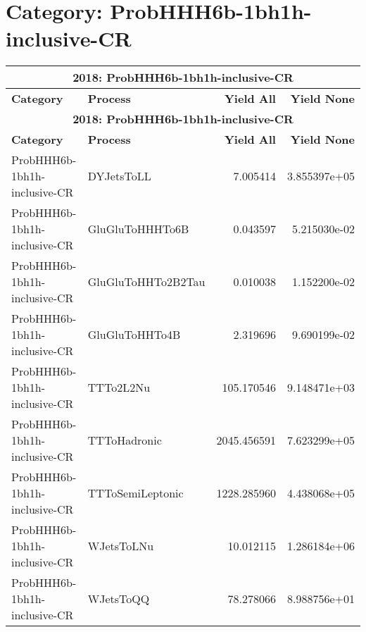 \documentclass{article}
\begin{document}
\section*{Category: ProbHHH6b-1bh1h-inclusive-CR}
\begin{longtable}[c]{|l|l|r|r|}
\hline
\multicolumn{4}{|c|}{\textbf{2018: ProbHHH6b-1bh1h-inclusive-CR}} \\
\hline
\textbf{Category} & \textbf{Process} & \textbf{Yield All} & \textbf{Yield None} \\
\hline
\endfirsthead
\hline
\multicolumn{4}{|c|}{\textbf{2018: ProbHHH6b-1bh1h-inclusive-CR}} \\
\hline
\textbf{Category} & \textbf{Process} & \textbf{Yield All} & \textbf{Yield None} \\
\hline
\endhead
ProbHHH6b-1bh1h-inclusive-CR & DYJetsToLL & 7.005414 & 3.855397e+05 \\
\hline
ProbHHH6b-1bh1h-inclusive-CR & GluGluToHHHTo6B & 0.043597 & 5.215030e-02 \\
\hline
ProbHHH6b-1bh1h-inclusive-CR & GluGluToHHTo2B2Tau & 0.010038 & 1.152200e-02 \\
\hline
ProbHHH6b-1bh1h-inclusive-CR & GluGluToHHTo4B & 2.319696 & 9.690199e-02 \\
\hline
ProbHHH6b-1bh1h-inclusive-CR & TTTo2L2Nu & 105.170546 & 9.148471e+03 \\
\hline
ProbHHH6b-1bh1h-inclusive-CR & TTToHadronic & 2045.456591 & 7.623299e+05 \\
\hline
ProbHHH6b-1bh1h-inclusive-CR & TTToSemiLeptonic & 1228.285960 & 4.438068e+05 \\
\hline
ProbHHH6b-1bh1h-inclusive-CR & WJetsToLNu & 10.012115 & 1.286184e+06 \\
\hline
ProbHHH6b-1bh1h-inclusive-CR & WJetsToQQ & 78.278066 & 8.988756e+01 \\
\hline
\end{longtable}
\end{document}
